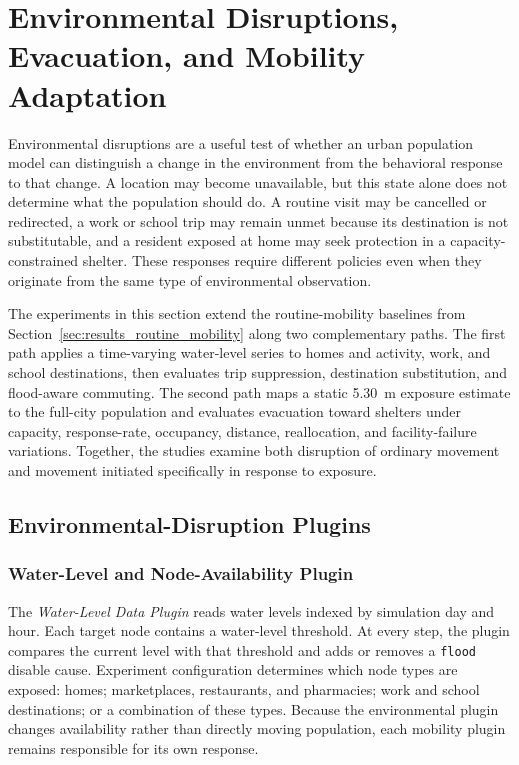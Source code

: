 \section{Environmental Disruptions, Evacuation, and Mobility Adaptation}
\label{sec:results_environment_disruptions}

Environmental disruptions are a useful test of whether an urban population model can distinguish a change in the environment from the behavioral response to that change. A location may become unavailable, but this state alone does not determine what the population should do. A routine visit may be cancelled or redirected, a work or school trip may remain unmet because its destination is not substitutable, and a resident exposed at home may seek protection in a capacity-constrained shelter. These responses require different policies even when they originate from the same type of environmental observation.

The experiments in this section extend the routine-mobility baselines from Section~\ref{sec:results_routine_mobility} along two complementary paths. The first path applies a time-varying water-level series to homes and activity, work, and school destinations, then evaluates trip suppression, destination substitution, and flood-aware commuting. The second path maps a static 5.30~m exposure estimate to the full-city population and evaluates evacuation toward shelters under capacity, response-rate, occupancy, distance, reallocation, and facility-failure variations. Together, the studies examine both disruption of ordinary movement and movement initiated specifically in response to exposure.

\subsection{Environmental-Disruption Plugins}
\label{sec:environment_disruption_plugins}

\subsubsection{Water-Level and Node-Availability Plugin}

The \textit{Water-Level Data Plugin} reads water levels indexed by simulation day and hour. Each target node contains a water-level threshold. At every step, the plugin compares the current level with that threshold and adds or removes a \texttt{flood} disable cause. Experiment configuration determines which node types are exposed: homes; marketplaces, restaurants, and pharmacies; work and school destinations; or a combination of these types. Because the environmental plugin changes availability rather than directly moving population, each mobility plugin remains responsible for its own response.

